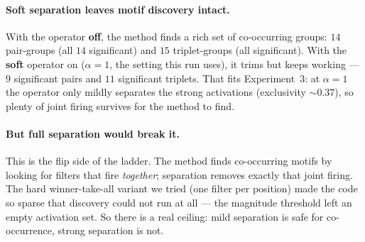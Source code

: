 \paragraph{Soft separation leaves motif discovery intact.} With the operator \textbf{off}, the
method finds a rich set of co-occurring groups: $14$ pair-groups (all $14$ significant) and $15$
triplet-groups (all significant). With the \textbf{soft} operator on ($\alpha=1$, the setting this
run uses), it trims but keeps working --- $9$ significant pairs and $11$ significant triplets. That
fits Experiment~3: at $\alpha=1$ the operator only mildly separates the strong activations
(exclusivity $\sim0.37$), so plenty of joint firing survives for the method to find.

\paragraph{But full separation would break it.} This is the flip side of the ladder. The method
finds co-occurring motifs by looking for filters that fire \emph{together}; separation removes
exactly that joint firing. The hard winner-take-all variant we tried (one filter per position)
made the code so sparse that discovery could not run at all --- the magnitude threshold left an
empty activation set. So there is a real ceiling: mild separation is safe for co-occurrence,
strong separation is not.
